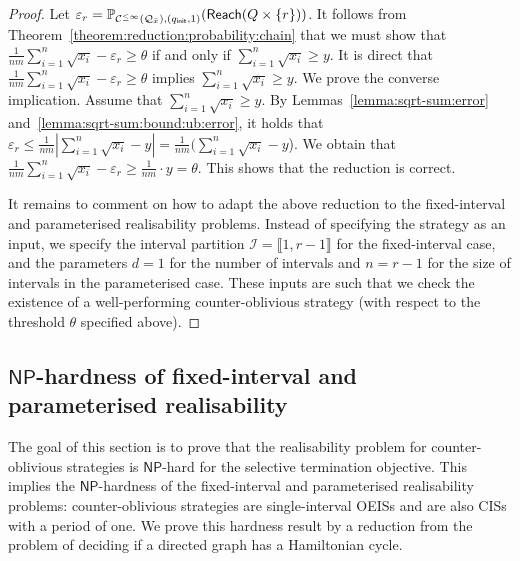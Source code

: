 \documentclass[a4paper,UKenglish,cleveref,autoref,thm-restate,colorlinks]{lipics-v2021}
\newcommand{\init}{\mathsf{init}}
\newcommand{\integerInterval}[1]{\llbracket{}#1\rrbracket{}}
\newcommand{\np}{\textsf{NP}}
\newcommand{\sqsx}{x} \newcommand{\sqsxVect}{\bar{x}} \newcommand{\sqsm}{m} \newcommand{\sqsy}{y} \newcommand{\sqsi}{i} \newcommand{\sqsn}{n} \newcommand{\sqsSize}{E}
\newcommand{\ocmdp}{\mathcal{Q}}
\newcommand{\ocStateSpace}{Q}
\newcommand{\ocState}{q}
\newcommand{\counterUB}{r}
\newcommand{\mchain}{\mathcal{C}}
\newcommand{\ocChainFin}[2]{\mchain^{\leq #2}(#1)}
\newcommand{\intPart}{\mathcal{I}}
\newcommand{\intNum}{d}
\newcommand{\intSize}{n}
\newcommand{\chainX}{\ocmdp_{\sqsxVect}}
\newcommand{\eleError}[1]{\varepsilon_{#1}}
\newcommand{\reach}[1]{\mathsf{Reach}(#1)}
\newcommand{\thresProba}{\theta}
\begin{document}
\begin{proof}
  Let $\eleError{\counterUB} = \probaMCverb{\ocChainFin{\chainX}{\infty}}{(\ocState_\init, 1)}(\reach{\ocStateSpace\times\{\counterUB\}})$.
  It follows from Theorem~\ref{theorem:reduction:probability:chain} that we must show that $\frac{1}{\sqsn\sqsm}\sum_{\sqsi=1}^\sqsn\sqrt{\sqsx_\sqsi} - \eleError{\counterUB}\geq\thresProba$ if and only if $\sum_{\sqsi=1}^\sqsn\sqrt{\sqsx_\sqsi}\geq\sqsy$.
  It is direct that $\frac{1}{\sqsn\sqsm}\sum_{\sqsi=1}^\sqsn\sqrt{\sqsx_\sqsi} - \eleError{\counterUB}\geq\thresProba$ implies $\sum_{\sqsi=1}^\sqsn\sqrt{\sqsx_\sqsi}\geq\sqsy$.
  We prove the converse implication.
  Assume that $\sum_{\sqsi=1}^\sqsn\sqrt{\sqsx_\sqsi}\geq\sqsy$.
  By Lemmas~\ref{lemma:sqrt-sum:error} and~\ref{lemma:sqrt-sum:bound:ub:error}, it holds that $\eleError{\counterUB}\leq\frac{1}{\sqsn\sqsm}|\sum_{\sqsi=1}^\sqsn\sqrt{\sqsx_\sqsi}-\sqsy| = \frac{1}{\sqsn\sqsm}(\sum_{\sqsi=1}^\sqsn\sqrt{\sqsx_\sqsi}-\sqsy$).
  We obtain that $\frac{1}{\sqsn\sqsm}\sum_{\sqsi=1}^\sqsn\sqrt{\sqsx_\sqsi} - \eleError{\counterUB}\geq \frac{1}{\sqsn\sqsm}\cdot\sqsy = \thresProba$.
  This shows that the reduction is correct.

  It remains to comment on how to adapt the above reduction to the fixed-interval and parameterised realisability problems.
  Instead of specifying the strategy as an input, we specify the interval partition $\intPart = \integerInterval{1, \counterUB-1}$ for the fixed-interval case, and the parameters $\intNum=1$ for the number of intervals and $\intSize=\counterUB-1$ for the size of intervals in the parameterised case.
  These inputs are such that we check the existence of a well-performing counter-oblivious strategy (with respect to the threshold $\thresProba$ specified above).
\end{proof}

\subsection{\texorpdfstring{$\np$}{NP}-hardness of fixed-interval and parameterised realisability}\label{section:hardness:np}

The goal of this section is to prove that the realisability problem for counter-oblivious strategies is $\np$-hard for the selective termination objective.
This implies the $\np$-hardness of the fixed-interval and parameterised realisability problems: counter-oblivious strategies are single-interval OEISs and are also CISs with a period of one.
We prove this hardness result by a reduction from the problem of deciding if a directed graph has a Hamiltonian cycle.
\end{document}
